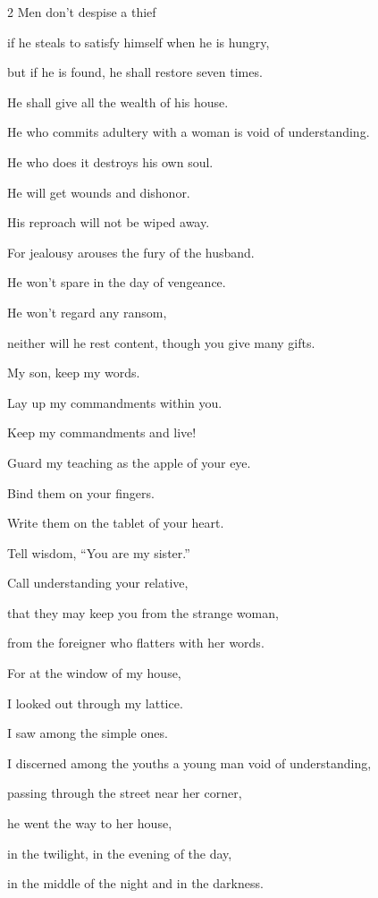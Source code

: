 \begin{multicols}{2}
\myverse{}Men don’t despise a thief

if he steals to satisfy himself when he is hungry,


\myverse{}but if he is found, he shall restore seven times.

He shall give all the wealth of his house.


\myverse{}He who commits adultery with a woman is void of understanding.

He who does it destroys his own soul.


\myverse{}He will get wounds and dishonor.

His reproach will not be wiped away.


\myverse{}For jealousy arouses the fury of the husband.

He won’t spare in the day of vengeance.


\myverse{}He won’t regard any ransom,

neither will he rest content, though you give many gifts.


\mychapter{} \myverse*{}My son, keep my words.

Lay up my commandments within you.


\myverse{}Keep my commandments and live!

Guard my teaching as the apple of your eye.


\myverse{}Bind them on your fingers.

Write them on the tablet of your heart.


\myverse{}Tell wisdom, “You are my sister.”

Call understanding your relative,


\myverse{}that they may keep you from the strange woman,

from the foreigner who flatters with her words.


\myverse{}For at the window of my house,

I looked out through my lattice.


\myverse{}I saw among the simple ones.

I discerned among the youths a young man void of understanding,


\myverse{}passing through the street near her corner,

he went the way to her house,


\myverse{}in the twilight, in the evening of the day,

in the middle of the night and in the darkness.



\end{multicols}
